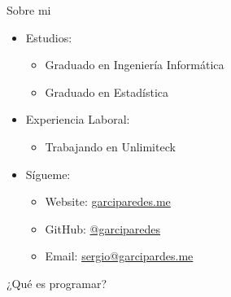 \documentclass{beamer}
\begin{document}
\begin{frame}{Sobre mi}
\begin{minipage}{.74\textwidth}
\begin{itemize}
            \item Estudios:
            \begin{itemize}
              \item [\emoji{desktop-computer}] Graduado en Ingeniería Informática
              \item [\emoji{chart-increasing}] Graduado en Estadística
            \end{itemize}
            \item Experiencia Laboral:
            \begin{itemize}
              \item [\emoji{rocket}] Trabajando en Unlimiteck
            \end{itemize}
            \item Sígueme:
                \begin{itemize}
                    \item Website: \href{http://garciparedes.me}{garciparedes.me}
                    \item GitHub: \href{http://github.com/garciparedes}{@garciparedes}
                    \item Email: \href{mailto:sergio@garcipardes.me}{sergio@garcipardes.me}
                \end{itemize}
          \end{itemize}
      \end{minipage}
    \end{frame}

    \begin{frame}{¿Qué es programar?}
      \noindent
      \begin{minipage}{.69\textwidth}
      \end{minipage}
      \begin{minipage}{.29\textwidth}
          \begin{center}
            \fontsize{40}{50}
          \end{center}
      \end{minipage}
    \end{frame}
\end{document}
